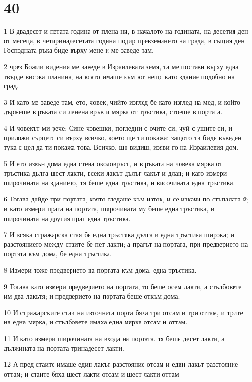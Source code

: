\chapter{40}

\par 1 В двадесет и петата година от плена ни, в началото на годината, на десетия ден от месеца, в четиринадесетата година подир превземането на града, в същия ден Господната ръка биде върху мене и ме заведе там, -
\par 2 чрез Божии видения ме заведе в Израилевата земя, та ме постави върху една твърде висока планина, на която имаше към юг нещо като здание подобно на град.
\par 3 И като ме заведе там, ето, човек, чийто изглед бе като изглед на мед, и който държеше в ръката си ленена връв и мярка от тръстика, стоеше в портата.
\par 4 И човекът ми рече: Сине човешки, погледни с очите си, чуй с ушите си, и приложи сърцето си върху всичко, което ще ти покажа; защото ти биде въведен тука с цел да ти покажа това. Всичко, що видиш, изяви го на Израилевия дом.
\par 5 И ето извън дома една стена околовръст, и в ръката на човека мярка от тръстика дълга шест лакти, всеки лакът дълъг лакът и длан; и като измери широчината на зданието, тя беше една тръстика, и височината една тръстика.
\par 6 Тогава дойде при портата, която гледаше към изток, и се изкачи по стъпалата й; и като измери прага на портата, широчината му беше една тръстика, и широчината на другия праг една тръстика.
\par 7 И всяка стражарска стая бе една тръстика дълга и една тръстика широка; и разстоянието между стаите бе пет лакти; а прагът на портата, при предверието на портата към дома, бе една тръстика.
\par 8 Измери тоже предверието на портата към дома, една тръстика.
\par 9 Тогава като измери предверието на портата, то беше осем лакти, а стълбовете им два лакътя; и предверието на портата беше откъм дома.
\par 10 И стражарските стаи на източната порта бяха три отсам и три оттам, и трите на една мярка; и стълбовете имаха една мярка отсам и оттам.
\par 11 И като измери широчината на входа на портата, тя беше десет лакти, а дължината на портата тринадесет лакти.
\par 12 А пред стаите имаше един лакът разстояние отсам и един лакът разстояние оттам; и стаите бяха шест лакти отсам и шест лакти оттам.
